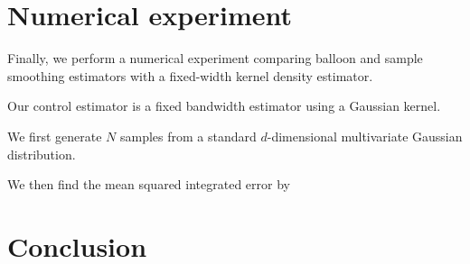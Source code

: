 \documentclass{article}
\begin{document}
\section{Numerical experiment}

Finally, we perform a numerical experiment comparing balloon and sample smoothing estimators with a fixed-width kernel density estimator. 

Our control estimator is a fixed bandwidth estimator using a Gaussian kernel.

We first generate $N$ samples from a standard $d$-dimensional multivariate Gaussian distribution.

We then find the mean squared integrated error by



\section{Conclusion}

\printbibliography
\end{document}
